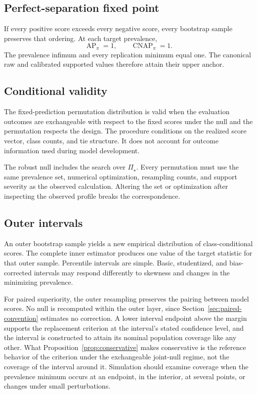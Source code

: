 \documentclass[11pt]{article}
\newcommand{\AP}{\operatorname{AP}}
\newcommand{\CNAP}{\operatorname{CNAP}}
\newcommand{\PSet}{\Pi_\star}
\theoremstyle{remark}
\begin{document}
\subsection{Perfect-separation fixed point}

If every positive score exceeds every negative score, every bootstrap sample preserves that ordering. At each target prevalence,
\[
\AP_\pi=1,
\qquad
\CNAP_\pi=1.
\]
The prevalence infimum and every replication minimum equal one. The canonical raw and calibrated supported values therefore attain their upper anchor.

\subsection{Conditional validity}

The fixed-prediction permutation distribution is valid when the evaluation outcomes are exchangeable with respect to the fixed scores under the null and the permutation respects the design. The procedure conditions on the realized score vector, class counts, and tie structure. It does not account for outcome information used during model development.

The robust null includes the search over $\PSet$. Every permutation must use the same prevalence set, numerical optimization, resampling counts, and support severity as the observed calculation. Altering the set or optimization after inspecting the observed profile breaks the correspondence.

\subsection{Outer intervals}

An outer bootstrap sample yields a new empirical distribution of class-conditional scores. The complete inner estimator produces one value of the target statistic for that outer sample. Percentile intervals are simple. Basic, studentized, and bias-corrected intervals may respond differently to skewness and changes in the minimizing prevalence.

For paired superiority, the outer resampling preserves the pairing between model scores. No null is recomputed within the outer layer, since Section~\ref{sec:paired-convention} estimates no correction. A lower interval endpoint above the margin supports the replacement criterion at the interval's stated confidence level, and the interval is constructed to attain its nominal population coverage like any other. What Proposition~\ref{prop:conservative} makes conservative is the reference behavior of the criterion under the exchangeable joint-null regime, not the coverage of the interval around it. Simulation should examine coverage when the prevalence minimum occurs at an endpoint, in the interior, at several points, or changes under small perturbations.
\end{document}
